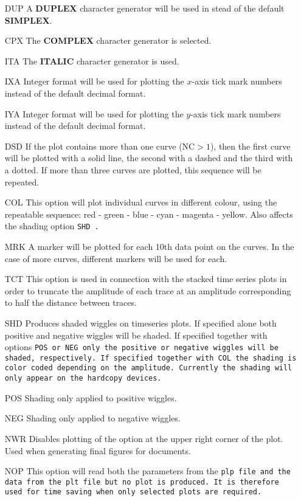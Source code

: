 \begin{itemize}
\item[DUP] A {\bf DUPLEX} character generator will be used in stead of the
	default {\bf SIMPLEX}.
\item[CPX] The {\bf COMPLEX} character generator is selected. 
\item[ITA] The {\bf ITALIC} character generator is used.
\item[IXA] Integer format will be used for plotting the $x$-axis tick mark numbers	instead of the default decimal format.
\item[IYA] Integer format will be used for plotting the $y$-axis tick mark numbers	instead of the default decimal format.
\item[DSD] If the plot contains more than one curve (NC$>1$), then the first 
	curve will be plotted with a solid line, the second with a dashed and
	the third with a dotted. If more than three curves are plotted, this
	sequence will be repeated. 
\item[COL] This option will plot individual curves in different colour, using
	the repeatable sequence: red - green - blue - cyan - magenta -
yellow.
Also affects the shading option \tt SHD \rm.
\item[MRK] A marker will be plotted for each 10th data point on the curves. In
	the case of more curves, different markers will be used for each. 
\item[TCT] This option is used in connection with the stacked time series
	plots in order to truncate the amplitude of each trace at an amplitude
	corresponding to half the distance between traces. 
\item[SHD] Produces shaded wiggles on timeseries plots. If specified
alone both positive and negative wiggles will be shaded. If specified
together with options \tt POS \rm or \tt NEG \rm only the positive or
negative wiggles will be shaded, respectively. If specified together
with \tt COL \rm the shading is color coded depending on the
amplitude. Currently the shading will only appear on the hardcopy
devices.
\item[POS] Shading only applied to positive wiggles.
\item[NEG] Shading only applied to negative wiggles.
\item[NWR] Disables plotting of the option at the upper right corner
of the plot. Used when generating final figures for documents.
\item[NOP] This option will read both the parameters from the \tt plp \rm file and 
	the data from the \tt plt \rm file but no plot is produced. It is therefore
	used for time saving when only selected plots are required. 
\end{itemize}

